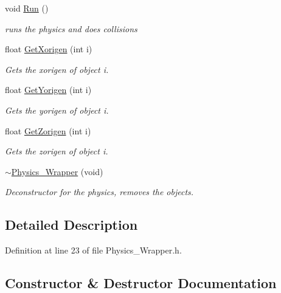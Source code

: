 \begin{DoxyCompactItemize}
void \hyperlink{class_physics___wrapper_a44206cbcb107fd318b4d5733749347da}{Run} ()
\begin{DoxyCompactList}\small\item\em runs the physics and does collisions \end{DoxyCompactList}\item 
float \hyperlink{class_physics___wrapper_af09f12720b0c1cfccf863a0da5a67256}{Get\+Xorigen} (int i)
\begin{DoxyCompactList}\small\item\em Gets the xorigen of object i. \end{DoxyCompactList}\item 
float \hyperlink{class_physics___wrapper_aa29e033ac2a859a5266d838c664a7d8f}{Get\+Yorigen} (int i)
\begin{DoxyCompactList}\small\item\em Gets the yorigen of object i. \end{DoxyCompactList}\item 
float \hyperlink{class_physics___wrapper_ae820a269c9cd59c5989cf76914e9b2d0}{Get\+Zorigen} (int i)
\begin{DoxyCompactList}\small\item\em Gets the zorigen of object i. \end{DoxyCompactList}\item 
\hyperlink{class_physics___wrapper_ae7ba13b97d91686f6392900bb80a6c7f}{$\sim$\+Physics\+\_\+\+Wrapper} (void)
\begin{DoxyCompactList}\small\item\em Deconstructor for the physics, removes the objects. \end{DoxyCompactList}\end{DoxyCompactItemize}


\subsection{Detailed Description}


Definition at line 23 of file Physics\+\_\+\+Wrapper.\+h.



\subsection{Constructor \& Destructor Documentation}
\hypertarget{class_physics___wrapper_aa0b708aeb83526134e5b5436526a77f9}{}
